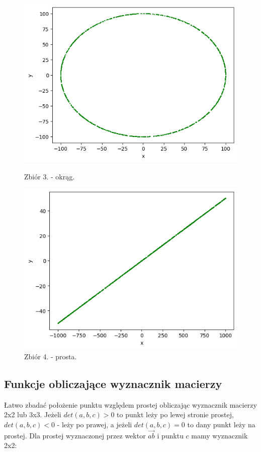 \documentclass[11pt]{scrartcl}
\begin{document}
    \begin{figure}[H]
        \centering
        \begin{minipage}{0.45\linewidth}
          \centering
          \includegraphics[width=1\linewidth]{1_3.png}
          \caption{Zbiór 3. - okrąg.}
        \end{minipage}
        \begin{minipage}{0.45\linewidth}
          \centering
          \includegraphics[width=1\linewidth]{1_4.png}
          \caption{Zbiór 4. - prosta.}
        \end{minipage}
    \end{figure}

    \subsection{Funkcje obliczające wyznacznik macierzy}
    Łatwo zbadać położenie punktu względem prostej obliczając wyznacznik macierzy
    2x2 lub 3x3. Jeżeli $det(a,b,c) > 0$ to punkt leży po lewej stronie prostej,
    $det(a,b,c) < 0$ - leży po prawej, a jeżeli $det(a,b,c) = 0$ to dany punkt
    leży na prostej. Dla prostej wyznaczonej przez wektor $\overrightarrow{ab}$
    i punktu $c$ mamy wyznacznik 2x2:
\end{document}
